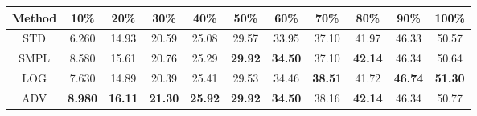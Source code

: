 \documentclass{standalone}
\begin{document}
\begin{tabular}{c|cccccccccc}
      \toprule
      Method & 10\% & 20\% & 30\% & 40\% & 50\% & 60\% & 70\% & 80\% & 90\% & 100\% \\
      \midrule
STD & 6.260 & 14.93 & 20.59 & 25.08 & 29.57 & 33.95 & 37.10 & 41.97 & 46.33 & 50.57\\
SMPL & 8.580 & 15.61 & 20.76 & 25.29 & \textbf{29.92} & \textbf{34.50} & 37.10 & \textbf{42.14} & 46.34 & 50.64\\
LOG & 7.630 & 14.89 & 20.39 & 25.41 & 29.53 & 34.46 & \textbf{38.51} & 41.72 & \textbf{46.74} & \textbf{51.30}\\
ADV & \textbf{8.980} & \textbf{16.11} & \textbf{21.30} & \textbf{25.92} & \textbf{29.92} & \textbf{34.50} & 38.16 & \textbf{42.14} & 46.34 & 50.77\\
  \bottomrule
\end{tabular}
\end{document}
